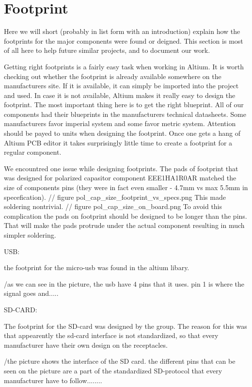 \section {Footprint}

Here we will short (probably in list form with an introduction) explain how the footprints for the major components were found or deigned.
This section is most of all here to help future similar projects, and to document our work.

Getting right footprints is a fairly easy task when working in Altium.
It is worth checking out whether the footprint is already available somewhere on the manufacturers site.
If it is available, it can simply be imported into the project and used.
In case it is not available, Altium makes it really easy to design the footprint.
The most important thing here is to get the right blueprint.
All of our components had their blueprints in the manufacturers technical datasheets.
Some manufacturers favor imperial system and some favor metric system.
Attention should be payed to units when designing the footprint.
Once one gets a hang of Altium PCB editor it takes surprisingly little time to create a footprint for a regular component.

We encountred one issue while designing footprints.
The pads of footprint that was designed for polarized capasitor component EEE1HA1R0AR matched the size of components pins (they were in fact even smaller - 4.7mm vs max 5.5mm in specefication). 
// figure pol_cap_size_footprint_vs_specs.png
This made soldering nontrivial.
// figure pol_cap_size_on_board.png
To avoid this complication the pads on footprint should be designed to be longer than the pins.
That will make the pads protrude under the actual component resulting in much simpler soldering.

USB:

the footprint for the micro-usb was found in the altium libary. 


/as we can see in the picture, the usb have 4 pins that it uses. pin 1 is where the signal goes and.....

SD-CARD:

The footprint for the SD-card was designed by the group. The reason for this was that appearently the sd-card interface is not standardized, so that 
every manufacturer have their own design on the receptacles. 


/the picture shows the interface of the SD card. the different pins that can be seen on the picture are a part of the standardized SD-protocol that 
every manufacturer have to follow........

